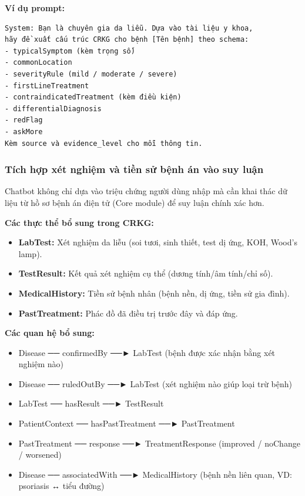 \documentclass[12pt,a4paper]{article}
\begin{document}
\textbf{Ví dụ prompt:}
\begin{verbatim}
System: Bạn là chuyên gia da liễu. Dựa vào tài liệu y khoa,
hãy đề xuất cấu trúc CRKG cho bệnh [Tên bệnh] theo schema:
- typicalSymptom (kèm trọng số)
- commonLocation
- severityRule (mild / moderate / severe)
- firstLineTreatment
- contraindicatedTreatment (kèm điều kiện)
- differentialDiagnosis
- redFlag
- askMore
Kèm source và evidence_level cho mỗi thông tin.
\end{verbatim}

\subsubsection{Tích hợp xét nghiệm và tiền sử bệnh án vào suy luận}

Chatbot không chỉ dựa vào triệu chứng người dùng nhập mà cần khai thác dữ liệu từ hồ sơ bệnh án điện tử (Core module) để suy luận chính xác hơn.

\textbf{Các thực thể bổ sung trong CRKG:}
\begin{itemize}
    \item \textbf{LabTest:} Xét nghiệm da liễu (soi tươi, sinh thiết, test dị ứng, KOH, Wood's lamp).
    \item \textbf{TestResult:} Kết quả xét nghiệm cụ thể (dương tính/âm tính/chỉ số).
    \item \textbf{MedicalHistory:} Tiền sử bệnh nhân (bệnh nền, dị ứng, tiền sử gia đình).
    \item \textbf{PastTreatment:} Phác đồ đã điều trị trước đây và đáp ứng.
\end{itemize}

\textbf{Các quan hệ bổ sung:}
\begin{itemize}
    \item Disease ── confirmedBy ──► LabTest (bệnh được xác nhận bằng xét nghiệm nào)
    \item Disease ── ruledOutBy ──► LabTest (xét nghiệm nào giúp loại trừ bệnh)
    \item LabTest ── hasResult ──► TestResult
    \item PatientContext ── hasPastTreatment ──► PastTreatment
    \item PastTreatment ── response ──► TreatmentResponse (improved / noChange / worsened)
    \item Disease ── associatedWith ──► MedicalHistory (bệnh nền liên quan, VD: psoriasis ↔ tiểu đường)
\end{itemize}
\end{document}
